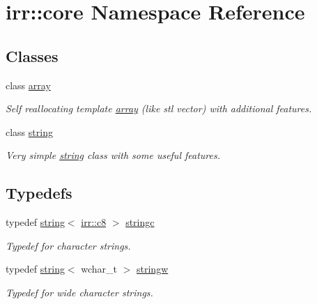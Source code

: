 \hypertarget{namespaceirr_1_1core}{
\section{irr::core Namespace Reference}
\label{namespaceirr_1_1core}
}
\subsection*{Classes}
\begin{CompactItemize}
\item 
class \hyperlink{classirr_1_1core_1_1array}{array}
\begin{CompactList}\small\item\em Self reallocating template \hyperlink{classirr_1_1core_1_1array}{array} (like stl vector) with additional features. \item\end{CompactList}\item 
class \hyperlink{classirr_1_1core_1_1string}{string}
\begin{CompactList}\small\item\em Very simple \hyperlink{classirr_1_1core_1_1string}{string} class with some useful features. \item\end{CompactList}\end{CompactItemize}
\subsection*{Typedefs}
\begin{CompactItemize}
\item 
typedef \hyperlink{classirr_1_1core_1_1string}{string}$<$ \hyperlink{namespaceirr_9395eaea339bcb546b319e9c96bf7410}{irr::c8} $>$ \hyperlink{namespaceirr_1_1core_996ee8f29e0c934ab4b7b6087d09f5f5}{stringc}
\begin{CompactList}\small\item\em Typedef for character strings. \item\end{CompactList}\item 
typedef \hyperlink{classirr_1_1core_1_1string}{string}$<$ wchar\_\-t $>$ \hyperlink{namespaceirr_1_1core_ef83fafbb1b36fcce44c07c9be23a7f2}{stringw}
\begin{CompactList}\small\item\em Typedef for wide character strings. \item\end{CompactList}\end{CompactItemize}
